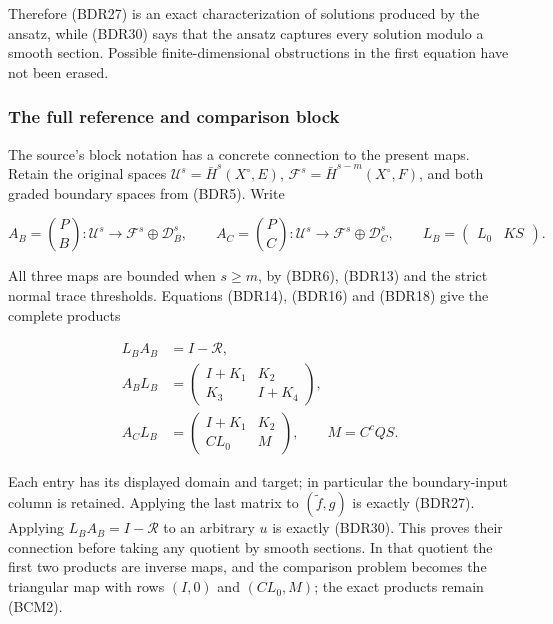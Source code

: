 \documentclass[
  11pt,
]{article}
\begin{document}
Therefore (BDR27) is an exact characterization of solutions produced by
the ansatz, while (BDR30) says that the ansatz captures every solution
modulo a smooth section. Possible finite-dimensional obstructions in the
first equation have not been erased.

\subsubsection{The full reference and comparison
block}\label{the-full-reference-and-comparison-block}

The source's block notation has a concrete connection to the present
maps. Retain the original spaces \(\mathcal U^s=\bar H^s(X^\circ,E)\),
\(\mathcal F^s=\bar H^{s-m}(X^\circ,F)\), and both graded boundary
spaces from (BDR5). Write

\[
 A_B=\binom P B:\mathcal U^s\longrightarrow
             \mathcal F^s\oplus\mathcal D_B^s,
 \qquad
 A_C=\binom P C:\mathcal U^s\longrightarrow
             \mathcal F^s\oplus\mathcal D_C^s,
 \qquad
 L_B=\begin{pmatrix}L_0&KS\end{pmatrix}.
 \tag{BCM1}
\]

All three maps are bounded when \(s\geq m\), by (BDR6), (BDR13) and the
strict normal trace thresholds. Equations (BDR14), (BDR16) and (BDR18)
give the complete products

\[
 \begin{aligned}
 L_BA_B&=I-\mathcal R,\\
 A_BL_B&=\begin{pmatrix}I+K_1&K_2\\K_3&I+K_4\end{pmatrix},\\
 A_CL_B&=\begin{pmatrix}I+K_1&K_2\\CL_0&M\end{pmatrix},
       \qquad M=C^cQS.
 \end{aligned}
 \tag{BCM2}
\]

Each entry has its displayed domain and target; in particular the
boundary-input column is retained. Applying the last matrix to
\((\widetilde f,g)\) is exactly (BDR27). Applying
\(L_BA_B=I-\mathcal R\) to an arbitrary \(u\) is exactly (BDR30). This
proves their connection before taking any quotient by smooth sections.
In that quotient the first two products are inverse maps, and the
comparison problem becomes the triangular map with rows \((I,0)\) and
\((CL_0,M)\); the exact products remain (BCM2).
\end{document}

